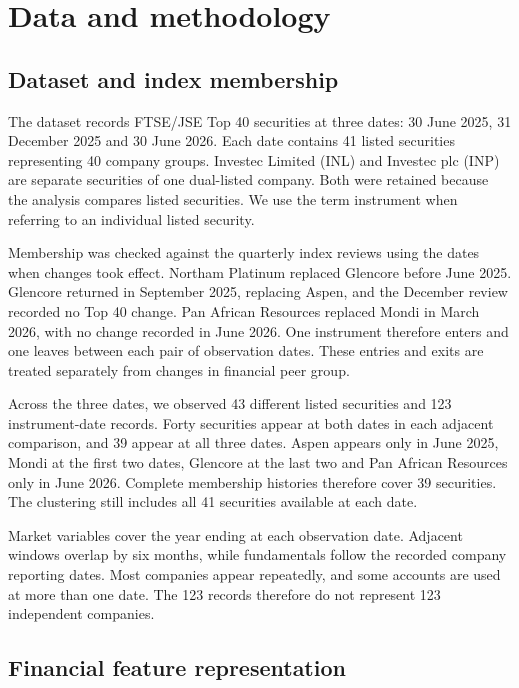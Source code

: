 \section{Data and methodology}

\subsection{Dataset and index membership}

The dataset records FTSE/JSE Top 40 securities at three dates: 30 June 2025, 31 December 2025 and 30 June 2026. Each date contains 41 listed securities representing 40 company groups. Investec Limited (INL) and Investec plc (INP) are separate securities of one dual-listed company. Both were retained because the analysis compares listed securities. We use the term instrument when referring to an individual listed security.

Membership was checked against the quarterly index reviews using the dates when changes took effect. Northam Platinum replaced Glencore before June 2025. Glencore returned in September 2025, replacing Aspen, and the December review recorded no Top 40 change. Pan African Resources replaced Mondi in March 2026, with no change recorded in June 2026. One instrument therefore enters and one leaves between each pair of observation dates. These entries and exits are treated separately from changes in financial peer group.

Across the three dates, we observed 43 different listed securities and 123 instrument-date records. Forty securities appear at both dates in each adjacent comparison, and 39 appear at all three dates. Aspen appears only in June 2025, Mondi at the first two dates, Glencore at the last two and Pan African Resources only in June 2026. Complete membership histories therefore cover 39 securities. The clustering still includes all 41 securities available at each date.

Market variables cover the year ending at each observation date. Adjacent windows overlap by six months, while fundamentals follow the recorded company reporting dates. Most companies appear repeatedly, and some accounts are used at more than one date. The 123 records therefore do not represent 123 independent companies.


\subsection{Financial feature representation}

